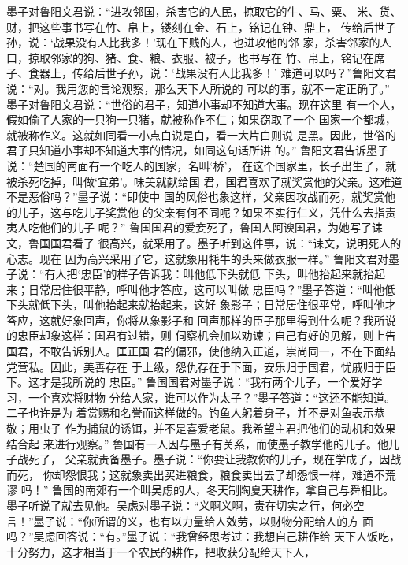 \documentclass[12pt,UTF8]{ctexbook}
\begin{document}
墨子对鲁阳文君说：“进攻邻国，杀害它的人民，掠取它的牛、马、粟、 
米、货、财，把这些事书写在竹、帛上，镂刻在金、石上，铭记在钟、鼎上， 
传给后世子孙，说：‘战果没有人比我多！’现在下贱的人，也进攻他的邻 
家，杀害邻家的人口，掠取邻家的狗、猪、食、粮、衣服、被子，也书写在 
竹、帛上，铭记在席子、食器上，传给后世子孙，说：‘战果没有人比我多！’ 
难道可以吗？”鲁阳文君说：“对。我用您的言论观察，那么天下人所说的 
可以的事，就不一定正确了。” 
墨子对鲁阳文君说：“世俗的君子，知道小事却不知道大事。现在这里 
有一个人，假如偷了人家的一只狗一只猪，就被称作不仁；如果窃取了一个 
国家一个都城，就被称作义。这就如同看一小点白说是白，看一大片白则说 
是黑。因此，世俗的君子只知道小事却不知道大事的情况，如同这句话所讲 
的。” 
鲁阳文君告诉墨子说：“楚国的南面有一个吃人的国家，名叫‘桥’， 
在这个国家里，长子出生了，就被杀死吃掉，叫做‘宜弟’。味美就献给国 
君，国君喜欢了就奖赏他的父亲。这难道不是恶俗吗？”墨子说：“即使中 
国的风俗也象这样，父亲因攻战而死，就奖赏他的儿子，这与吃儿子奖赏他 
的父亲有何不同呢？如果不实行仁义，凭什么去指责夷人吃他们的儿子 
呢？” 
鲁国国君的爱妾死了，鲁国人阿谀国君，为她写了诔文，鲁国国君看了 
很高兴，就采用了。墨子听到这件事，说：“诔文，说明死人的心志。现在 
因为高兴采用了它，这就象用牦牛的头来做衣服一样。” 
鲁阳文君对墨子说：“有人把‘忠臣’的样子告诉我：叫他低下头就低 
下头，叫他抬起来就抬起来；日常居住很平静，呼叫他才答应，这可以叫做 
忠臣吗？”墨子答道：“叫他低下头就低下头，叫他抬起来就抬起来，这好 
象影子；日常居住很平常，呼叫他才答应，这就好象回声，你将从象影子和 
回声那样的臣子那里得到什么呢？我所说的忠臣却象这样：国君有过错，则 
伺察机会加以劝谏；自己有好的见解，则上告国君，不敢告诉别人。匡正国 
君的偏邪，使他纳入正道，崇尚同一，不在下面结党营私。因此，美善存在 
于上级，怨仇存在于下面，安乐归于国君，忧戚归于臣下。这才是我所说的 
忠臣。” 
鲁国国君对墨子说：“我有两个儿子，一个爱好学习，一个喜欢将财物 
分给人家，谁可以作为太子？”墨子答道：“这还不能知道。二子也许是为 
着赏赐和名誉而这样做的。钓鱼人躬着身子，并不是对鱼表示恭敬；用虫子 
作为捕鼠的诱饵，并不是喜爱老鼠。我希望主君把他们的动机和效果结合起 
来进行观察。” 
鲁国有一人因与墨子有关系，而使墨子教学他的儿子。他儿子战死了， 
父亲就责备墨子。墨子说：“你要让我教你的儿子，现在学成了，因战而死， 
你却怨恨我；这就象卖出买进粮食，粮食卖出去了却怨恨一样，难道不荒谬 
吗！” 
鲁国的南郊有一个叫吴虑的人，冬天制陶夏天耕作，拿自己与舜相比。 
墨子听说了就去见他。吴虑对墨子说：“义啊义啊，责在切实之行，何必空 
言！”墨子说：“你所谓的义，也有以力量给人效劳，以财物分配给人的方 
面吗？”吴虑回答说：“有。”墨子说：“我曾经思考过：我想自己耕作给 
天下人饭吃，十分努力，这才相当于一个农民的耕作，把收获分配给天下人， 
\end{document}

